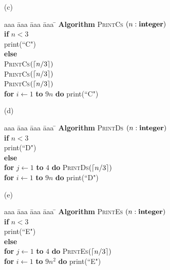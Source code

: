 \documentclass{article}
\begin{document}
\begin{problem}
\bigskip
\noindent
(c)\ \ 
\begin{minipage}[t]{3in}
\begin{tabbing}
aaa \= aaa \= aaa \= aaa \=  \kill
\textbf{Algorithm} \textsc{PrintCs} $(n: \mbox{\bf integer})$ \\
          \> \textbf{if} $n < 3$ \\
          \>\>  print(``C") \\
          \>\textbf{else} \\
         	\>\>  \textsc{PrintCs}$({\left\lceil n/3\right\rceil})$\\
			\>\>  \textsc{PrintCs}$({\left\lceil n/3\right\rceil})$\\
			\>\>  \textsc{PrintCs}$({\left\lceil n/3\right\rceil})$\\
      	  	\>\> \textbf{for} $i \leftarrow 1$ \textbf{to} $9n$ \textbf{do} print(``C")
\end{tabbing}
\end{minipage}

\bigskip
\noindent
(d)\ \ 
\begin{minipage}[t]{3in}
\begin{tabbing}
aaa \= aaa \= aaa \= aaa \=  \kill
\textbf{Algorithm} \textsc{PrintDs} $(n: \mbox{\bf integer})$ \\
          \> \textbf{if} $n < 3$ \\
          \>\>  print(``D") \\
          \>\textbf{else} \\
         		\>\>  \textbf{for} $j \leftarrow 1$ \textbf{to} $4$ \textbf{do} \textsc{PrintDs}$({\left\lceil n/3\right\rceil})$\\
				\>\> \textbf{for} $i \leftarrow 1$ \textbf{to} $9 n$ \textbf{do} print(``D")
\end{tabbing}
\end{minipage}


\bigskip
\noindent
(e)\ \ 
\begin{minipage}[t]{3in}
\begin{tabbing}
aaa \= aaa \= aaa \= aaa \=  \kill
\textbf{Algorithm} \textsc{PrintEs} $(n: \mbox{\bf integer})$ \\
          \> \textbf{if} $n < 3$ \\
          \>\>  print(``E") \\
          \>\textbf{else} \\
         		\>\>  \textbf{for} $j \leftarrow 1$ \textbf{to} $4$ \textbf{do} \textsc{PrintEs}$({\left\lceil n/3\right\rceil})$\\
  				\>\> \textbf{for} $i \leftarrow 1$ \textbf{to} $9 n^2$ \textbf{do} print(``E")
\end{tabbing}
\end{minipage}



\end{problem}
\end{document}
